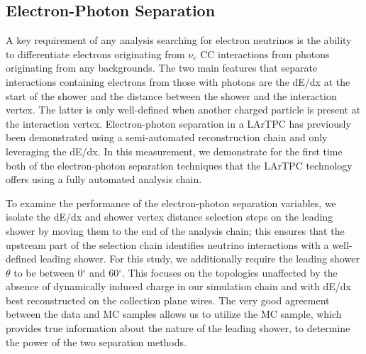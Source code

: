\subsection{Electron-Photon Separation}\label{sec:dEdx}

A key requirement of any analysis searching for electron neutrinos is the ability to differentiate electrons originating from $\nu_e$ CC interactions from photons originating from any backgrounds. The two main features that separate interactions containing electrons from those with photons are the dE/dx at the start of the shower and the distance between the shower and the interaction vertex. The latter is only well-defined when another charged particle is present at the interaction vertex. Electron-photon separation in a LArTPC has previously been demonstrated using a semi-automated reconstruction chain \cite{Acciarri:2016sli} and only leveraging the dE/dx. 
In this measurement, we demonstrate  for the first time both of the electron-photon separation techniques that the LArTPC technology offers using a fully automated analysis chain.

To examine the performance of the electron-photon separation variables, we isolate the dE/dx and shower vertex distance selection steps on the leading shower by moving them to the end of the analysis chain; this ensures that the upstream part of the selection chain identifies neutrino interactions with a well-defined leading shower. For this study, we additionally require the leading shower $\theta$ to be between 0$^{\circ}$ and 60$^{\circ}$. This focuses on the topologies unaffected by the absence of dynamically induced charge in our simulation chain and with dE/dx best reconstructed on the collection plane wires. The very good agreement between the  data and MC samples allows us to utilize the MC sample, which provides true information about the nature of the leading shower, to determine the power of the two separation methods.

